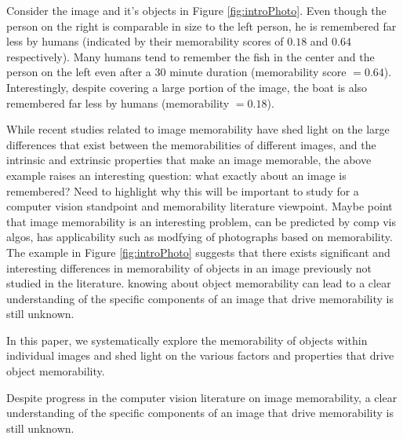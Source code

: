 Consider the image and it's objects in Figure \ref{fig:introPhoto}. Even though the person on the right is comparable in size to the left person, he is remembered far less by humans (indicated by their memorability scores of $0.18$ and $0.64$ respectively). Many humans tend to remember the fish in the center and the person on the left even after a $30$ minute duration (memorability score $= 0.64$). Interestingly, despite covering a large portion of the image, the boat is also remembered far less by humans (memorability $= 0.18$). 

While recent studies related to image memorability have shed light on the large differences that exist between the memorabilities of different images, and the intrinsic and extrinsic properties that make an image memorable, the above example raises an interesting question: what exactly about an image is remembered?  Need to highlight why this will be important to study for a computer vision standpoint and memorability literature viewpoint. Maybe point that image memorability is an interesting problem, can be predicted by comp vis algos, has applicability such as modfying of photographs based on memorability. The example in Figure \ref{fig:introPhoto} suggests that there exists significant and interesting differences in memorability of objects in an image previously not studied in the literature. knowing about object memorability can lead to a clear understanding of the specific components of an image that drive memorability is still unknown.







In this paper, we systematically explore the memorability of objects within individual images and shed light on the various factors and properties that drive object memorability.


Despite progress in the computer vision literature on image memorability, a clear understanding of the specific components of an image that drive memorability is still unknown.


